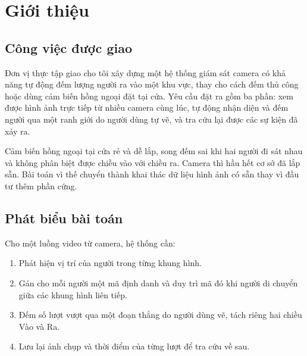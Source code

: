 %
\chapter{Giới thiệu}
\label{ch:gioithieu}

\section{Công việc được giao}
\label{sec:congviec}


Đơn vị thực tập giao cho tôi xây dựng một hệ thống giám sát camera có khả năng
tự động đếm lượng người ra vào một khu vực, thay cho cách đếm thủ công hoặc dùng
cảm biến hồng ngoại đặt tại cửa. Yêu cầu đặt ra gồm ba phần: xem được hình ảnh
trực tiếp từ nhiều camera cùng lúc, tự động nhận diện và đếm người qua một ranh
giới do người dùng tự vẽ, và tra cứu lại được các sự kiện đã xảy ra.

Cảm biến hồng ngoại tại cửa rẻ và dễ lắp, song đếm sai khi hai người đi sát nhau
và không phân biệt được chiều vào với chiều ra. Camera thì hầu hết cơ sở đã lắp
sẵn. Bài toán vì thế chuyển thành khai thác dữ liệu hình ảnh có sẵn thay vì đầu
tư thêm phần cứng.

\section{Phát biểu bài toán}
\label{sec:baitoan}

Cho một luồng video từ camera, hệ thống cần:

\begin{enumerate}[leftmargin=*, itemsep=2pt]
  \item Phát hiện vị trí của người trong từng khung hình.
  \item Gán cho mỗi người một mã định danh và duy trì mã đó khi người di chuyển
        giữa các khung hình liên tiếp.
  \item Đếm số lượt vượt qua một đoạn thẳng do người dùng vẽ, tách riêng hai
        chiều Vào và Ra.
  \item Lưu lại ảnh chụp và thời điểm của từng lượt để tra cứu về sau.
\end{enumerate}

